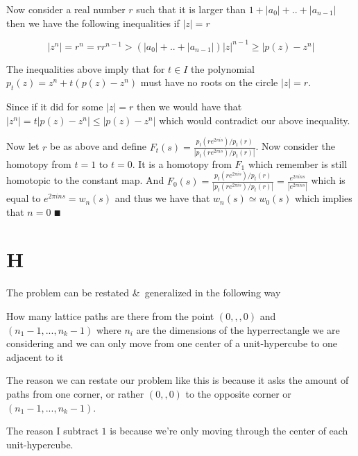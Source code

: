 \documentclass[paper=a4,fontsize=paper,12.5pt]{book}
\newcommand{\3}{\vspace*{3mm}}
\begin{document}
\3

Now consider a real number $r$ such that it is larger than $1 + |{a}_{0}| + .. + |{a}_{n-1}|$ then we have the following inequalities if $|z| = r$

\3

\[|{z}^{n}| = {r}^{n} = {r}{r}^{n-1} > (|a_{0}| + .. + |a_{n-1}|){|z|}^{n-1} \geq |p(z) - {z}^{n}| \]

\3

The inequalities above imply that for $t \in I$ the polynomial $p_{t}(z) = {z}^{n} + t(p(z) - {z}^{n})$ must have no roots on the circle $|z| = r$.


Since if it did for some $|z| = r$ then we would have that $|{z}^{n}| = t|p(z) - {z}^{n}| \leq |p(z) - {z}^{n}|$ which would contradict our above inequality.

\3

Now let $r$ be as above and define ${F}_{t}(s) = \frac{p_{t}(r{e}^{2\pi i s})/p_{t}(r)}{|p_{t}(r{e}^{2\pi i s})/p_{t}(r)|}$. Now consider the homotopy from $t = 1$ to $t = 0$. It is a homotopy from ${F}_{1}$ which remember is still homotopic to the constant map. And $F_{0}(s) = \frac{p_{t}(r{e}^{2\pi i s})/p_{t}(r)}{|p_{t}(r{e}^{2\pi i s})/p_{t}(r)|} = \frac{e^{2 \pi i n s}}{|{e}^{2\pi i n s}|} $ which is equal to ${e}^{2\pi i n s} = {w}_{n}(s)$ and thus we have that ${w}_{n}(s) \simeq {w}_{0}(s)$ which implies that $n = 0$ $\QED$

\3

\section*{H}

\3

The problem can be restated \&\ generalized in the following way

\3

How many lattice paths are there from the point $(0,,,0)$ and $({n}_{1}-1, ..., {n}_{k}-1)$ where ${n}_{i}$ are the dimensions of the hyperrectangle we are considering and we can only move from one center of a unit-hypercube to one adjacent to it

\3

The reason we can restate our problem like this is because it asks the amount of paths from one corner, or rather $(0,,0)$ to the opposite corner or $({n}_{1}-1, ..., {n}_{k}-1)$.

\3

The reason I subtract $1$ is because we're only moving through the center of each unit-hypercube.
\end{document}
